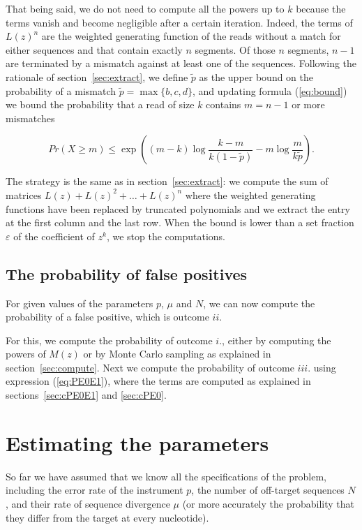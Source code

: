 \documentclass{article}
\begin{document}
That being said, we do not need to compute all the powers up to $k$
because the terms vanish and become negligible after a certain iteration.
Indeed, the terms of $L(z)^n$ are the weighted generating function of the
reads without a match for either sequences and that contain exactly $n$
segments. Of those $n$ segments, $n-1$ are terminated by a mismatch
against at least one of the sequences. Following the rationale of
section~\ref{sec:extract}, we define $\tilde{p}$ as the upper bound on the
probability of a mismatch $\tilde{p} = \max\{b,c,d\}$, and updating
formula (\ref{eq:bound}) we bound the probability that a read of size $k$
contains $m = n-1$ or more mismatches

\begin{equation*}
Pr(X \geq m) \leq \exp \left( (m-k)\log \frac{k-m}{k(1-\tilde{p})} -m\log
\frac{m}{k\tilde{p}} \right).
\end{equation*}

The strategy is the same as in section~\ref{sec:extract}: we compute the
sum of matrices $L(z) + L(z)^2 + \ldots + L(z)^n$ where the weighted
generating functions have been replaced by truncated polynomials and we
extract the entry at the first column and the last row. When the bound is
lower than a set fraction $\varepsilon$ of the coefficient of $z^k$, we
stop the computations.

\subsection{The probability of false positives}

For given values of the parameters $p$, $\mu$ and $N$, we can now compute
the probability of a false positive, which is outcome $ii$.

For this, we compute the probability of outcome $i.$, either by computing
the powers of $M(z)$ or by Monte Carlo sampling as explained in
section~\ref{sec:compute}. Next we compute the probability of outcome
$iii.$ using expression (\ref{eq:PE0E1}), where the terms are computed as
explained in sections~\ref{sec:cPE0E1} and \ref{sec:cPE0}.

\section{Estimating the parameters}
\label{sec:est}

So far we have assumed that we know all the specifications of the problem,
including the error rate of the instrument $p$, the number of off-target
sequences $N$, and their rate of sequence divergence $\mu$ (or more
accurately the probability that they differ from the target at every
nucleotide).
\end{document}
